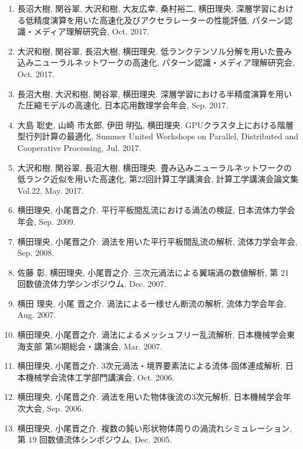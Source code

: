 \documentclass[margin,line]{cv}
\begin{document}
\begin{resume}
\begin{enumerate}
\item 長沼大樹, 関谷翠, 大沢和樹, 大友広幸, 桑村裕二, 横田理央. 深層学習における低精度演算を用いた高速化及びアクセラレーターの性能評価, パターン認識・メディア理解研究会, Oct. 2017.

\item 大沢和樹, 関谷翠, 長沼大樹, 横田理央. 低ランクテンソル分解を用いた畳み込みニューラルネットワークの高速化, パターン認識・メディア理解研究会, Oct. 2017.

\item 長沼大樹, 大沢和樹, 関谷翠, 横田理央. 深層学習における半精度演算を用いた圧縮モデルの高速化, 日本応用数理学会年会, Sep. 2017.

\item 大島 聡史, 山崎 市太郎, 伊田 明弘, 横田理央. GPUクラスタ上における階層型行列計算の最適化, Summer United Workshops on Parallel, Distributed and Cooperative Processing, Jul. 2017.

\item 大沢和樹, 関谷翠, 長沼大樹, 横田理央. 畳み込みニューラルネットワークの低ランク近似を用いた高速化, 第22回計算工学講演会, 計算工学講演会論文集 Vol.22, May. 2017.

\item 横田理央, 小尾晋之介. 平行平板間乱流における渦法の検証, 日本流体力学会年会, Sep. 2009.

\item 横田理央, 小尾晋之介. 渦法を用いた平行平板間乱流の解析, 流体力学会年会, Sep. 2008.

\item 佐藤 彰, 横田理央, 小尾晋之介. 三次元渦法による翼端渦の数値解析, 第 21 回数値流体力学シンポジウム, Dec. 2007.

\item 横田 理央, 小尾 晋之介. 渦法による一様せん断流の解析, 流体力学会年会, Aug. 2007.

\item 横田理央, 小尾晋之介. 渦法によるメッシュフリー乱流解析, 日本機械学会東海支部 第56期総会・講演会, Mar. 2007.

\item 横田理央, 小尾晋之介. 3次元渦法・境界要素法による流体-固体連成解析, 日本機械学会流体工学部門講演会, Oct. 2006.

\item 横田理央, 小尾晋之介. 渦法を用いた物体後流の3次元解析, 日本機械学会年次大会, Sep. 2006.

\item 横田理央, 小尾晋之介. 複数の鈍い形状物体周りの渦流れシミュレーション, 第 19 回数値流体シンポジウム, Dec. 2005.
\end{enumerate}


\end{resume}
\end{document}
